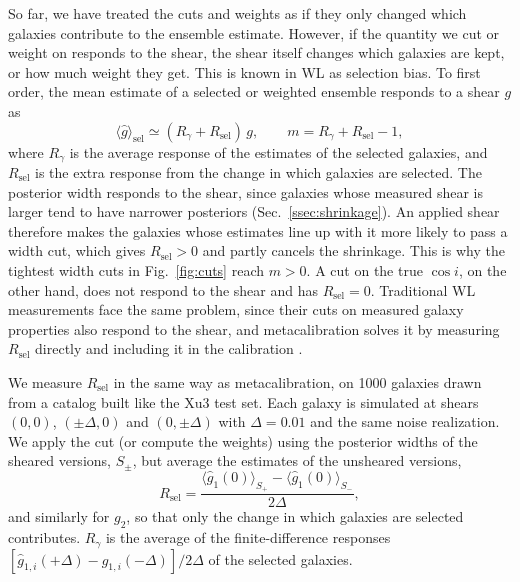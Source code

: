 So far, we have treated the cuts and weights as if they only changed which galaxies contribute to the ensemble estimate. However, if the quantity we cut or weight on responds to the shear, the shear itself changes which galaxies are kept, or how much weight they get. This is known in WL as selection bias. To first order, the mean estimate of a selected or weighted ensemble responds to a shear $g$ as
\begin{equation}
\label{eqn:selection-response}
    \langle\hat{g}\rangle_\mathrm{sel} \simeq (R_\gamma + R_\mathrm{sel})\, g, \qquad m = R_\gamma + R_\mathrm{sel} - 1,
\end{equation}
where $R_\gamma$ is the average response of the estimates of the selected galaxies, and $R_\mathrm{sel}$ is the extra response from the change in which galaxies are selected. The posterior width responds to the shear, since galaxies whose measured shear is larger tend to have narrower posteriors (Sec.~\ref{ssec:shrinkage}). An applied shear therefore makes the galaxies whose estimates line up with it more likely to pass a width cut, which gives $R_\mathrm{sel} > 0$ and partly cancels the shrinkage. This is why the tightest width cuts in Fig.~\ref{fig:cuts} reach $m > 0$. A cut on the true $\cos i$, on the other hand, does not respond to the shear and has $R_\mathrm{sel} = 0$. Traditional WL measurements face the same problem, since their cuts on measured galaxy properties also respond to the shear, and metacalibration solves it by measuring $R_\mathrm{sel}$ directly and including it in the calibration \citep{MetacalPractical, Metadet}.

We measure $R_\mathrm{sel}$ in the same way as metacalibration, on 1000 galaxies drawn from a catalog built like the Xu3 test set. Each galaxy is simulated at shears $(0,0)$, $(\pm\Delta, 0)$ and $(0, \pm\Delta)$ with $\Delta = 0.01$ and the same noise realization. We apply the cut (or compute the weights) using the posterior widths of the sheared versions, $S_\pm$, but average the estimates of the unsheared versions,
\begin{equation}
\label{eqn:rsel}
    R_\mathrm{sel} = \frac{\langle \hat{g}_1(0) \rangle_{S_+} - \langle \hat{g}_1(0) \rangle_{S_-}}{2\Delta},
\end{equation}
and similarly for $g_2$, so that only the change in which galaxies are selected contributes. $R_\gamma$ is the average of the finite-difference responses $[\hat{g}_{1,i}(+\Delta) - \hat{g}_{1,i}(-\Delta)]/2\Delta$ of the selected galaxies.

